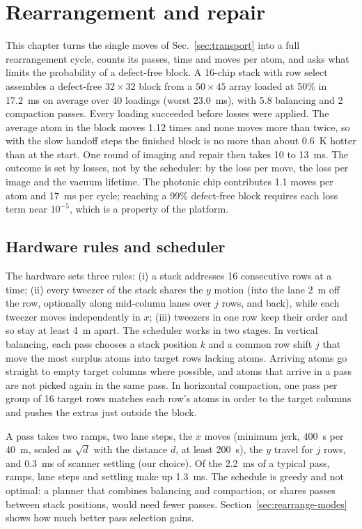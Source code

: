 \section{Rearrangement and repair}\label{sec:rearrange}

This chapter turns the single moves of Sec.~\ref{sec:transport} into a full rearrangement cycle, counts its passes, time and moves per atom, and asks what limits the probability of a defect-free block. A 16-chip stack with row select assembles a defect-free $32\times32$ block from a $50\times45$ array loaded at 50\% in 17.2~ms on average over 40 loadings (worst 23.0~ms), with 5.8 balancing and 2 compaction passes. Every loading succeeded before losses were applied. The average atom in the block moves 1.12 times and none moves more than twice, so with the slow handoff steps the finished block is no more than about 0.6~\textmu K hotter than at the start. One round of imaging and repair then takes 10 to 13~ms. The outcome is set by losses, not by the scheduler: by the loss per move, the loss per image and the vacuum lifetime. The photonic chip contributes 1.1 moves per atom and 17~ms per cycle; reaching a 99\% defect-free block requires each loss term near $10^{-5}$, which is a property of the platform.

\subsection{Hardware rules and scheduler}\label{sec:rearrange-scheduler}

The hardware sets three rules: (i) a stack addresses 16 consecutive rows at a time; (ii) every tweezer of the stack shares the $y$ motion (into the lane 2~\textmu m off the row, optionally along mid-column lanes over $j$ rows, and back), while each tweezer moves independently in $x$; (iii) tweezers in one row keep their order and so stay at least 4~\textmu m apart. The scheduler works in two stages. In vertical balancing, each pass chooses a stack position $k$ and a common row shift $j$ that move the most surplus atoms into target rows lacking atoms. Arriving atoms go straight to empty target columns where possible, and atoms that arrive in a pass are not picked again in the same pass. In horizontal compaction, one pass per group of 16 target rows matches each row's atoms in order to the target columns and pushes the extras just outside the block.

A pass takes two ramps, two lane steps, the $x$ moves (minimum jerk, 400~\textmu s per 40~\textmu m, scaled as $\sqrt{d}$ with the distance $d$, at least 200~\textmu s), the $y$ travel for $j$ rows, and 0.3~ms of scanner settling (our choice). Of the 2.2~ms of a typical pass, ramps, lane steps and settling make up 1.3~ms. The schedule is greedy and not optimal: a planner that combines balancing and compaction, or shares passes between stack positions, would need fewer passes. Section~\ref{sec:rearrange-modes} shows how much better pass selection gains.

